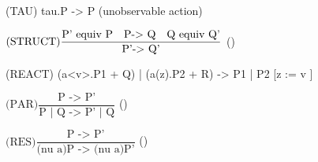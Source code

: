 \documentclass[landscape, a4paper]{article}
\begin{document}
\begin{minipage}[t]{0.19\linewidth}
\begin{betterlist}
		\begin{betterlist}
			\item (TAU) tau.P -> P (unobservable action)
			\item $\text{(STRUCT)}\dfrac{\text{P' equiv P\quad P-> Q\quad Q equiv Q'}}{\text{P'-> Q'}}$ ()
			\item (REACT) (a<v>.P1 + Q) | (a(z).P2 + R) -> P1 | P2 [z := v ]
			\item $\text{(PAR)}\dfrac{\text{P -> P'}}{\text{P | Q -> P' | Q}}$ ()
			\item $\text{(RES)}\dfrac{\text{P -> P'}}{\text{(nu a)P -> (nu a)P'}}$ ()
		\end{betterlist}
	\end{betterlist}


\end{minipage}
\end{document}
